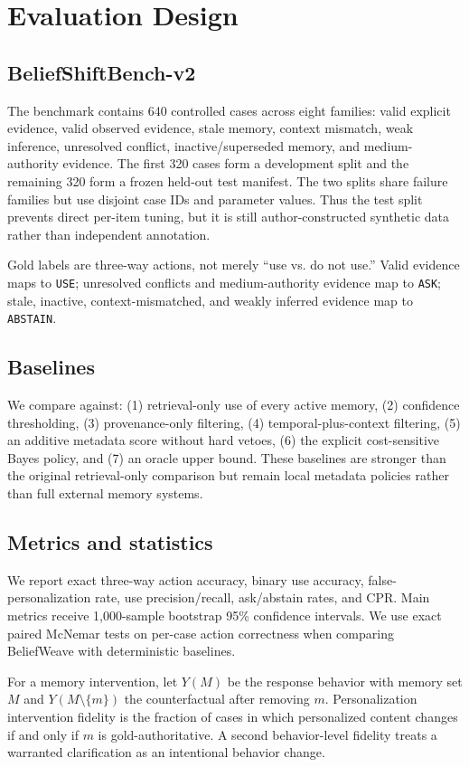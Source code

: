 \documentclass[10pt]{article}
\begin{document}
\section{Evaluation Design}
\subsection{BeliefShiftBench-v2}
The benchmark contains 640 controlled cases across eight families: valid explicit evidence, valid observed evidence, stale memory, context mismatch, weak inference, unresolved conflict, inactive/superseded memory, and medium-authority evidence. The first 320 cases form a development split and the remaining 320 form a frozen held-out test manifest. The two splits share failure families but use disjoint case IDs and parameter values. Thus the test split prevents direct per-item tuning, but it is still author-constructed synthetic data rather than independent annotation.

Gold labels are three-way actions, not merely ``use vs. do not use.'' Valid evidence maps to \texttt{USE}; unresolved conflicts and medium-authority evidence map to \texttt{ASK}; stale, inactive, context-mismatched, and weakly inferred evidence map to \texttt{ABSTAIN}.

\subsection{Baselines}
We compare against: (1) retrieval-only use of every active memory, (2) confidence thresholding, (3) provenance-only filtering, (4) temporal-plus-context filtering, (5) an additive metadata score without hard vetoes, (6) the explicit cost-sensitive Bayes policy, and (7) an oracle upper bound. These baselines are stronger than the original retrieval-only comparison but remain local metadata policies rather than full external memory systems.

\subsection{Metrics and statistics}
We report exact three-way action accuracy, binary use accuracy, false-personalization rate, use precision/recall, ask/abstain rates, and CPR. Main metrics receive 1,000-sample bootstrap 95\% confidence intervals. We use exact paired McNemar tests on per-case action correctness when comparing BeliefWeave with deterministic baselines.

For a memory intervention, let $Y(M)$ be the response behavior with memory set $M$ and $Y(M\setminus\{m\})$ the counterfactual after removing $m$. Personalization intervention fidelity is the fraction of cases in which personalized content changes if and only if $m$ is gold-authoritative. A second behavior-level fidelity treats a warranted clarification as an intentional behavior change.
\end{document}
